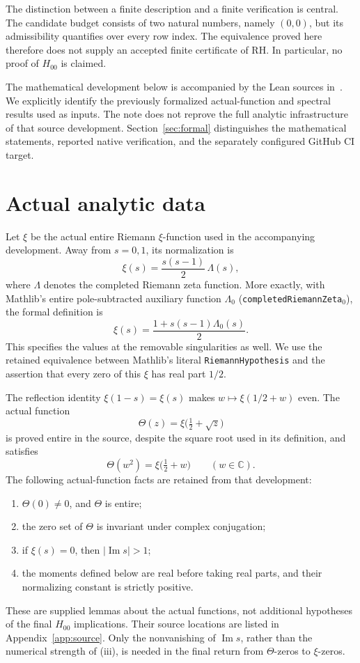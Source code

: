 \documentclass[11pt,a4paper]{article}
\theoremstyle{definition}
\numberwithin{equation}{section}
\newcommand{\Imm}{\operatorname{Im}}
\newcommand{\code}[1]{\texttt{\small #1}}
\begin{document}
The distinction between a finite description and a finite verification
is central. The candidate budget consists of two natural numbers, namely
$(0,0)$, but its admissibility quantifies over every row index. The
equivalence proved here therefore does not supply an accepted finite
certificate of RH. In particular, no proof of $H_{00}$ is claimed.

The mathematical development below is accompanied by the Lean sources
in~\cite{source}. We explicitly identify the previously formalized
actual-function and spectral results used as inputs. The note does not
reprove the full analytic infrastructure of that source development.
Section~\ref{sec:formal} distinguishes the mathematical statements,
reported native verification, and the separately configured GitHub CI
target.

\section{Actual analytic data}\label{sec:actual}
Let $\xi$ be the actual entire Riemann $\xi$-function used in the
accompanying development. Away from $s=0,1$, its normalization is
\begin{equation}\label{eq:xi}
 \xi(s)=\frac{s(s-1)}2\,\Lambda(s),
\end{equation}
where $\Lambda$ denotes the completed Riemann zeta function.
More exactly, with Mathlib's entire pole-subtracted auxiliary function
$\Lambda_0$ (\code{completedRiemannZeta}$_0$), the formal definition is
\[
 \xi(s)=\frac{1+s(s-1)\Lambda_0(s)}2.
\]
This specifies the values at the removable singularities as well. We use the retained equivalence between
Mathlib's literal \code{RiemannHypothesis} and the assertion that every
zero of this $\xi$ has real part $1/2$.

The reflection identity $\xi(1-s)=\xi(s)$ makes
$w\mapsto\xi(1/2+w)$ even. The actual function
\[
 \Theta(z)=\xi\bigl(\tfrac12+\sqrt z\bigr)
\]
is proved entire in the source, despite the square root used in its
definition, and satisfies
\begin{equation}\label{eq:centered-square}
 \Theta(w^2)=\xi\bigl(\tfrac12+w\bigr)\qquad(w\in\mathbb C).
\end{equation}
The following actual-function facts are retained from that development:
\begin{enumerate}[label=(\roman*)]
 \item $\Theta(0)\ne0$, and $\Theta$ is entire;
 \item the zero set of $\Theta$ is invariant under complex conjugation;
 \item if $\xi(s)=0$, then $|\Imm s|>1$;
 \item the moments defined below are real before taking real parts, and
 their normalizing constant is strictly positive.
\end{enumerate}
These are supplied lemmas about the actual functions, not additional
hypotheses of the final $H_{00}$ implications. Their source locations are
listed in Appendix~\ref{app:source}. Only the nonvanishing of $\Imm s$,
rather than the numerical strength of (iii), is needed in the final
return from $\Theta$-zeros to $\xi$-zeros.
\end{document}
